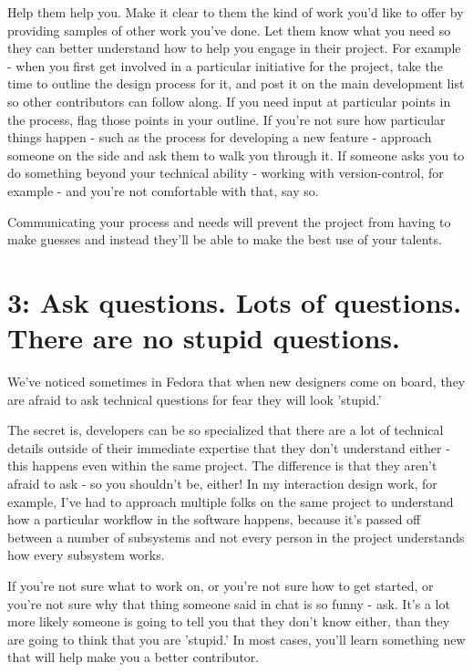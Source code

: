 Help them help you. Make it clear to them the kind of work you'd like to offer
by providing samples of other
work you've done. Let them know what you need so they can better understand how
to help you engage in their project. For example - when you first get involved
in a particular initiative for the project, take the time to outline the design
process for it, and post it on the main development list so other contributors
can follow along. If you need input at particular points in the process, flag
those points in your outline. If you're not sure how particular things happen -
such as the process for developing a new feature - approach someone on the side
and ask them to walk you through it. If someone asks you to do something beyond
your technical ability - working with version-control, for example - and you're
not comfortable with that, say so.

Communicating your process and needs will prevent the project from having to
make guesses and instead they'll be able to make the best use of your talents.

\section*{3: Ask questions. Lots of questions. There are no stupid questions.}

We've noticed sometimes in Fedora that when new designers come on board, they
are afraid to ask technical questions for fear they will look 'stupid.' 

The secret is, developers can be so specialized that there are a lot of
technical details outside of their immediate expertise that they don't
understand either - this happens even within the same project. The difference is
that they aren't afraid to ask - so you shouldn't be, either! In my interaction
design work, for example, I've had to approach multiple folks on the same
project to understand how a particular workflow in the software happens, because
it's passed off between a number of subsystems and not every person in the
project understands how every subsystem works. 

If you're not sure what to work on, or you're not sure how to get started, or
you're not sure why that thing someone said in chat is so funny - ask. It's a
lot more likely someone is going to tell you that they don't know either, than
they are going to think that you are 'stupid.' In most cases, you'll learn
something new that will help make you a better contributor.

